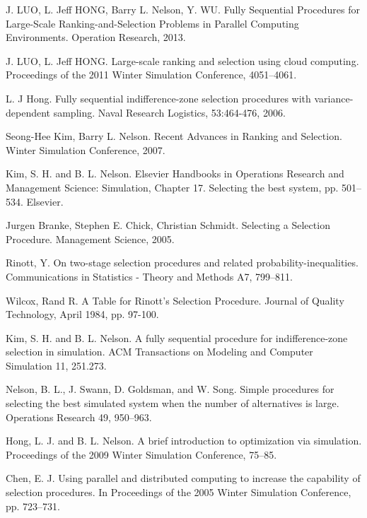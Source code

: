 
\begin{thebibliography}{99}

 J. LUO, L. Jeff HONG, Barry L. Nelson, Y. WU. Fully Sequential Procedures for Large-Scale Ranking-and-Selection Problems in Parallel Computing Environments. Operation Research, 2013.

 J. LUO, L. Jeff HONG. Large-scale ranking and selection using cloud computing. Proceedings of the 2011 Winter Simulation Conference, 4051–4061.

 L. J Hong. Fully sequential indifference-zone selection procedures with variance-dependent sampling. Naval Research Logistics, 53:464-476, 2006.

 Seong-Hee Kim, Barry L. Nelson. Recent Advances in Ranking and Selection. Winter Simulation Conference, 2007.

 Kim, S. H. and B. L. Nelson. Elsevier Handbooks in Operations Research and Management Science: Simulation, Chapter 17. Selecting the best system, pp. 501–534. Elsevier.

 Jurgen Branke, Stephen E. Chick, Christian Schmidt. Selecting a Selection Procedure. Management Science, 2005.

 Rinott, Y. On two-stage selection procedures and related probability-inequalities. Communications in Statistics - Theory and Methods A7, 799–811.

 Wilcox, Rand R. A Table for Rinott's Selection Procedure. Journal of Quality Technology, April 1984, pp. 97-100.

 Kim, S. H. and B. L. Nelson. A fully sequential procedure for indifference-zone selection in simulation. ACM Transactions on Modeling and Computer Simulation 11, 251.273.

 Nelson, B. L., J. Swann, D. Goldsman, and W. Song. Simple procedures for selecting the best simulated system when the number of alternatives is large. Operations Research 49, 950–963.

 Hong, L. J. and B. L. Nelson. A brief introduction to optimization via simulation. Proceedings of the 2009 Winter Simulation Conference, 75–85.

 Chen, E. J. Using parallel and distributed computing to increase the capability of selection procedures. In Proceedings of the 2005 Winter Simulation Conference, pp. 723–731.


\end{thebibliography}
